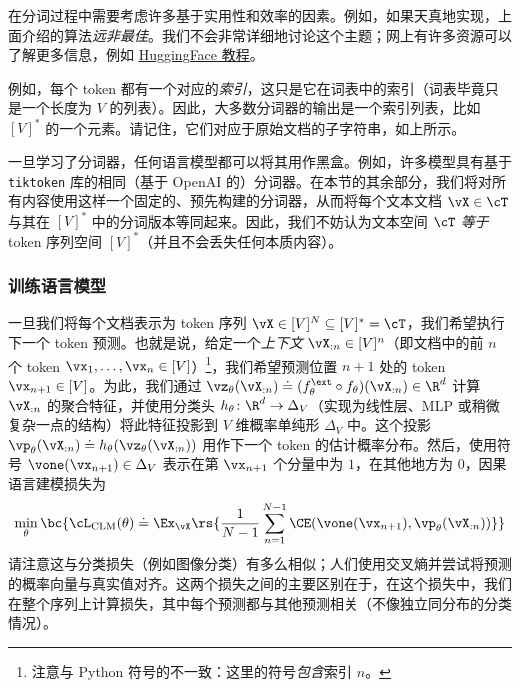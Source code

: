 \documentclass[../../book-main_zh.tex]{subfiles}
\begin{document}
在分词过程中需要考虑许多基于实用性和效率的因素。例如，如果天真地实现，上面介绍的算法\textit{远非最佳}。我们不会非常详细地讨论这个主题；网上有许多资源可以了解更多信息，例如
\href{https://huggingface.co/learn/nlp-course/en/chapter6/5}{HuggingFace
教程}。

例如，每个 token 都有一个对应的\textit{索引}，这只是它在词表中的索引（词表毕竟只是一个长度为 \(V\) 的列表）。因此，大多数分词器的输出是一个索引列表，比如 \([V]^{*}\) 的一个元素。请记住，它们对应于原始文档的子字符串，如上所示。

一旦学习了分词器，任何语言模型都可以将其用作黑盒。例如，许多模型具有基于 \texttt{tiktoken} 库的相同（基于 OpenAI 的）分词器。在本节的其余部分，我们将对所有内容使用这样一个固定的、预先构建的分词器，从而将每个文本文档 \(\vX \in \cT\) 与其在 \([V]^{*}\) 中的分词版本等同起来。因此，我们不妨认为文本空间 \(\cT\) \textit{等于} token 序列空间 \([V]^{*}\)（并且不会丢失任何本质内容）。

\subsubsection{训练语言模型}

一旦我们将每个文档表示为 token 序列 \(\vX \in [V]^{N} \subseteq [V]^{*} = \cT\)，我们希望执行下一个 token 预测。也就是说，给定一个\textit{上下文} \(\vX_{:n} \in [V]^{n}\)（即文档中的前 \(n\) 个 token \(\vx_{1}, \dots, \vx_{n} \in [V]\)）\footnote{注意与 Python 符号的不一致：这里的符号\textit{包含}索引 \(n\)。}，我们希望预测位置 \(n + 1\) 处的 token \(\vx_{n + 1} \in [V]\)。为此，我们通过 \(\vz_{\theta}(\vX_{:n}) \doteq (f_{\theta}^{\ext} \circ
f_{\theta})(\vX_{:n}) \in \R^{d}\) 计算 \(\vX_{:n}\) 的聚合特征，并使用分类头 \(h_{\theta} \colon \R^{d} \to \Delta_{V}\)（实现为线性层、MLP 或稍微复杂一点的结构）将此特征投影到 \(V\) 维概率单纯形 \(\Delta_{V}\) 中。这个投影 \(\vp_{\theta}(\vX_{:n}) \doteq h_{\theta}(\vz_{\theta}(\vX_{:n}))\) 用作下一个 token 的估计概率分布。然后，使用符号 \(\vone(\vx_{n + 1}) \in \Delta_{V}\) 表示在第 \(\vx_{n + 1}\) 个分量中为 \(1\)，在其他地方为 \(0\)，因果语言建模损失为
\begin{equation}\label{eq:clm_loss}
\min_{\theta}\bc{\cL_{\mathrm{CLM}}(\theta) \doteq
    \Ex_{\vX}\rs{\frac{1}{N - 1}\sum_{n = 1}^{N - 1}\CE(\vone(\vx_{n +
1}), \vp_{\theta}(\vX_{:n}))}}
\end{equation}
请注意这与分类损失（例如图像分类）有多么相似；人们使用交叉熵并尝试将预测的概率向量与真实值对齐。这两个损失之间的主要区别在于，在这个损失中，我们在整个序列上计算损失，其中每个预测都与其他预测相关（不像独立同分布的分类情况）。
\end{document}
